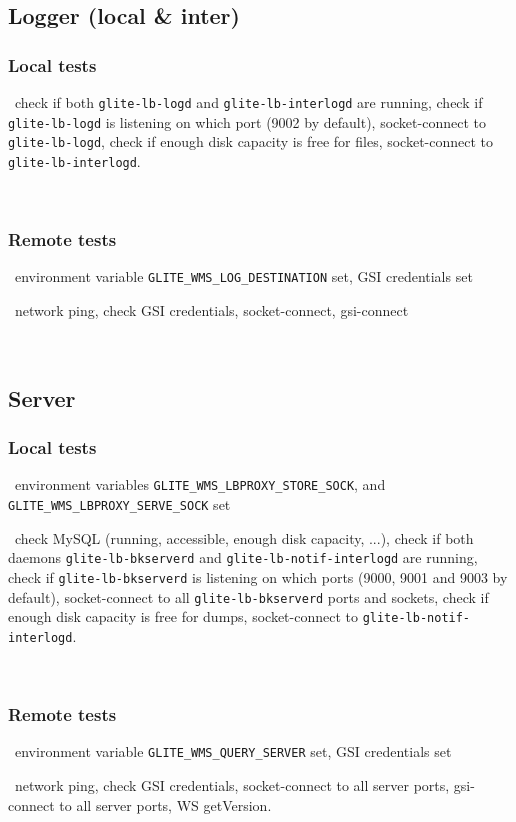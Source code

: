 \subsection{Logger (local \& inter)}

\subsubsection{Local tests}
\what\ check if both \texttt{glite-lb-logd} and \texttt{glite-lb-interlogd} are running,
check if \texttt{glite-lb-logd} is listening on which port (9002 by default),
socket-connect to \texttt{glite-lb-logd},
check if enough disk capacity is free for  files,
socket-connect to \texttt{glite-lb-interlogd}.

\how\ 


\subsubsection{Remote tests}
\req\ environment variable \texttt{GLITE\_WMS\_LOG\_DESTINATION} set, GSI credentials set

\what\ network ping,
check GSI credentials,
socket-connect,
gsi-connect

\how\ 


\subsection{Server}

\subsubsection{Local tests}
\req\ environment variables \texttt{GLITE\_WMS\_LBPROXY\_STORE\_SOCK},
and \texttt{GLITE\_WMS\_LBPROXY\_SERVE\_SOCK} set

\what\ check MySQL (running, accessible, enough disk capacity, ...),
check if both daemons \texttt{glite-lb-bkserverd} and \texttt{glite-lb-notif-interlogd} are running,
check if \texttt{glite-lb-bkserverd} is listening on which ports (9000, 9001 and 9003 by default),
socket-connect to all \texttt{glite-lb-bkserverd} ports and sockets,
check if enough disk capacity is free for dumps,
socket-connect to \texttt{glite-lb-notif-interlogd}.

\how\ 


\subsubsection{Remote tests}
\req\ environment variable \texttt{GLITE\_WMS\_QUERY\_SERVER} set, GSI credentials set

\what\ network ping,
check GSI credentials,
socket-connect to all server ports,
gsi-connect to all server ports,
WS getVersion.

\how\ 



